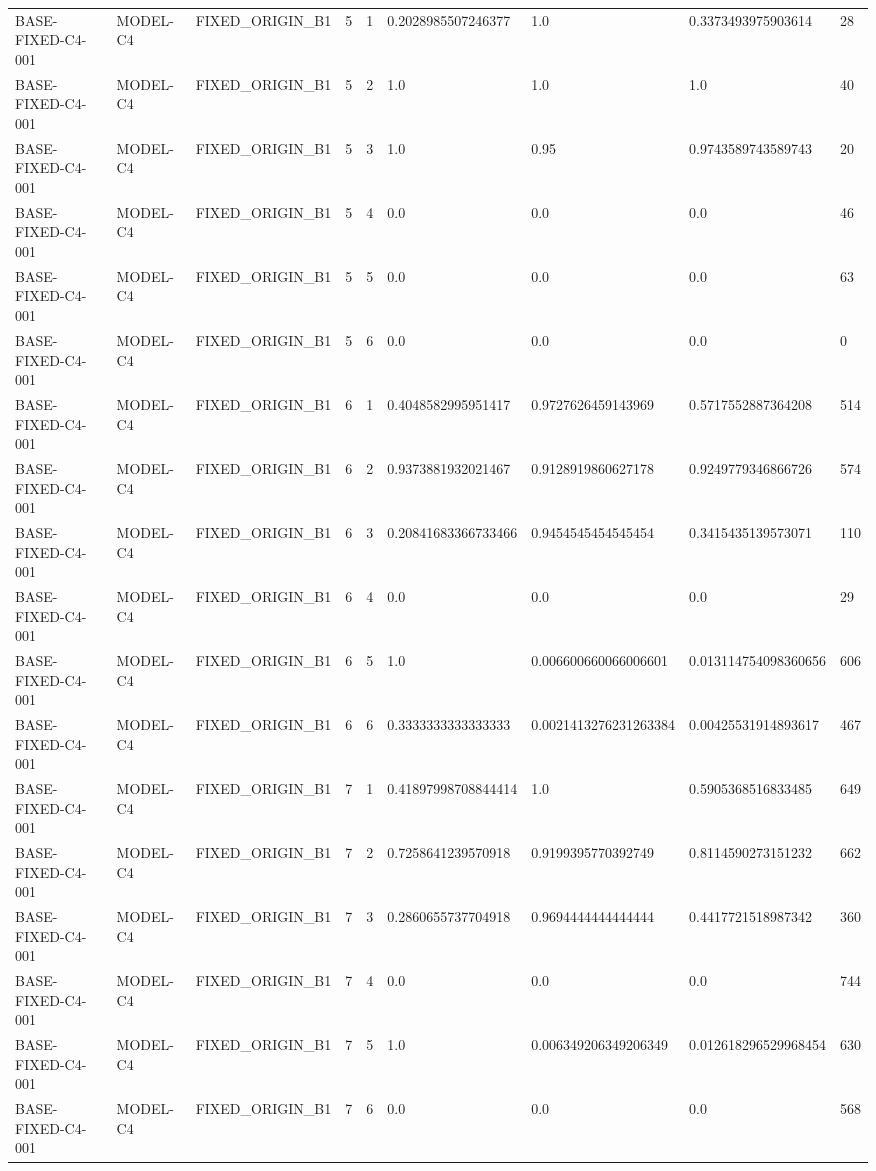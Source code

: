 \begin{tabular}{lllllllll}
BASE-FIXED-C4-001 & MODEL-C4 & FIXED\_ORIGIN\_B1 & 5 & 1 & 0.2028985507246377 & 1.0 & 0.3373493975903614 & 28 \\
BASE-FIXED-C4-001 & MODEL-C4 & FIXED\_ORIGIN\_B1 & 5 & 2 & 1.0 & 1.0 & 1.0 & 40 \\
BASE-FIXED-C4-001 & MODEL-C4 & FIXED\_ORIGIN\_B1 & 5 & 3 & 1.0 & 0.95 & 0.9743589743589743 & 20 \\
BASE-FIXED-C4-001 & MODEL-C4 & FIXED\_ORIGIN\_B1 & 5 & 4 & 0.0 & 0.0 & 0.0 & 46 \\
BASE-FIXED-C4-001 & MODEL-C4 & FIXED\_ORIGIN\_B1 & 5 & 5 & 0.0 & 0.0 & 0.0 & 63 \\
BASE-FIXED-C4-001 & MODEL-C4 & FIXED\_ORIGIN\_B1 & 5 & 6 & 0.0 & 0.0 & 0.0 & 0 \\
BASE-FIXED-C4-001 & MODEL-C4 & FIXED\_ORIGIN\_B1 & 6 & 1 & 0.4048582995951417 & 0.9727626459143969 & 0.5717552887364208 & 514 \\
BASE-FIXED-C4-001 & MODEL-C4 & FIXED\_ORIGIN\_B1 & 6 & 2 & 0.9373881932021467 & 0.9128919860627178 & 0.9249779346866726 & 574 \\
BASE-FIXED-C4-001 & MODEL-C4 & FIXED\_ORIGIN\_B1 & 6 & 3 & 0.20841683366733466 & 0.9454545454545454 & 0.3415435139573071 & 110 \\
BASE-FIXED-C4-001 & MODEL-C4 & FIXED\_ORIGIN\_B1 & 6 & 4 & 0.0 & 0.0 & 0.0 & 29 \\
BASE-FIXED-C4-001 & MODEL-C4 & FIXED\_ORIGIN\_B1 & 6 & 5 & 1.0 & 0.006600660066006601 & 0.013114754098360656 & 606 \\
BASE-FIXED-C4-001 & MODEL-C4 & FIXED\_ORIGIN\_B1 & 6 & 6 & 0.3333333333333333 & 0.0021413276231263384 & 0.00425531914893617 & 467 \\
BASE-FIXED-C4-001 & MODEL-C4 & FIXED\_ORIGIN\_B1 & 7 & 1 & 0.41897998708844414 & 1.0 & 0.5905368516833485 & 649 \\
BASE-FIXED-C4-001 & MODEL-C4 & FIXED\_ORIGIN\_B1 & 7 & 2 & 0.7258641239570918 & 0.9199395770392749 & 0.8114590273151232 & 662 \\
BASE-FIXED-C4-001 & MODEL-C4 & FIXED\_ORIGIN\_B1 & 7 & 3 & 0.2860655737704918 & 0.9694444444444444 & 0.4417721518987342 & 360 \\
BASE-FIXED-C4-001 & MODEL-C4 & FIXED\_ORIGIN\_B1 & 7 & 4 & 0.0 & 0.0 & 0.0 & 744 \\
BASE-FIXED-C4-001 & MODEL-C4 & FIXED\_ORIGIN\_B1 & 7 & 5 & 1.0 & 0.006349206349206349 & 0.012618296529968454 & 630 \\
BASE-FIXED-C4-001 & MODEL-C4 & FIXED\_ORIGIN\_B1 & 7 & 6 & 0.0 & 0.0 & 0.0 & 568 \\

\end{tabular}
